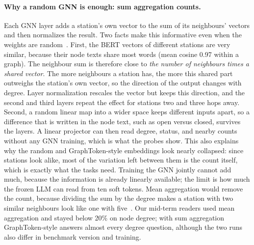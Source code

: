 \documentclass[11pt]{article}
\begin{document}
\paragraph{Why a random GNN is enough: sum aggregation counts.}
Each GNN layer adds a station's own vector to the sum of its neighbours' vectors and then normalizes the result.
Two facts make this informative even when the weights are random~\cite{kipf2017gcn}.
First, the BERT vectors of different stations are very similar, because their node texts share most words (mean cosine 0.97 within a graph).
The neighbour sum is therefore close to \emph{the number of neighbours times a shared vector}.
The more neighbours a station has, the more this shared part outweighs the station's own vector, so the direction of the output changes with degree.
Layer normalization rescales the vector but keeps this direction, and the second and third layers repeat the effect for stations two and three hops away.
Second, a random linear map into a wider space keeps different inputs apart, so a difference that is written in the node text, such as open versus closed, survives the layers.
A linear projector can then read degree, status, and nearby counts without any GNN training, which is what the probes show.
This also explains why the random and GraphToken-style embeddings look nearly collapsed: since stations look alike, most of the variation left between them is the count itself, which is exactly what the tasks need.
Training the GNN jointly cannot add much, because the information is already linearly available; the limit is how much the frozen LLM can read from ten soft tokens.
Mean aggregation would remove the count, because dividing the sum by the degree makes a station with two similar neighbours look like one with five~\cite{xu2019gin}.
Our mid-term readers used mean aggregation and stayed below 20\% on node degree; with sum aggregation GraphToken-style answers almost every degree question, although the two runs also differ in benchmark version and training.
\end{document}
